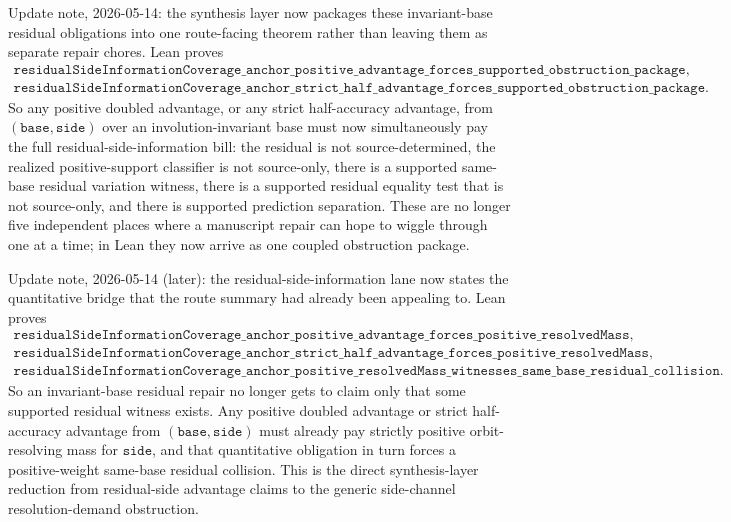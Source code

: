 \documentclass[11pt]{article}
\theoremstyle{remark}
\begin{document}
Update note, 2026-05-14: the synthesis layer now packages these invariant-base
residual obligations into one route-facing theorem rather than leaving them as
separate repair chores.  Lean proves
\[
\begin{gathered}
\texttt{residualSideInformationCoverage\_anchor\_positive\_advantage\_forces\_supported\_obstruction\_package},\\
\texttt{residualSideInformationCoverage\_anchor\_strict\_half\_advantage\_forces\_supported\_obstruction\_package}.
\end{gathered}
\]
So any positive doubled advantage, or any strict half-accuracy advantage, from
\((\texttt{base},\texttt{side})\) over an involution-invariant base must now
simultaneously pay the full residual-side-information bill: the residual is not
source-determined, the realized positive-support classifier is not source-only,
there is a supported same-base residual variation witness, there is a supported
residual equality test that is not source-only, and there is supported
prediction separation.  These are no longer five independent places where a
manuscript repair can hope to wiggle through one at a time; in Lean they now
arrive as one coupled obstruction package.

Update note, 2026-05-14 (later): the residual-side-information lane now states
the quantitative bridge that the route summary had already been appealing to.
Lean proves
\[
\begin{gathered}
\texttt{residualSideInformationCoverage\_anchor\_positive\_advantage\_forces\_positive\_resolvedMass},\\
\texttt{residualSideInformationCoverage\_anchor\_strict\_half\_advantage\_forces\_positive\_resolvedMass},\\
\texttt{residualSideInformationCoverage\_anchor\_positive\_resolvedMass\_witnesses\_same\_base\_residual\_collision}.
\end{gathered}
\]
So an invariant-base residual repair no longer gets to claim only that some
supported residual witness exists.  Any positive doubled advantage or strict
half-accuracy advantage from \((\texttt{base},\texttt{side})\) must already pay
strictly positive orbit-resolving mass for \(\texttt{side}\), and that
quantitative obligation in turn forces a positive-weight same-base residual
collision.  This is the direct synthesis-layer reduction from residual-side
advantage claims to the generic side-channel resolution-demand obstruction.
\end{document}
